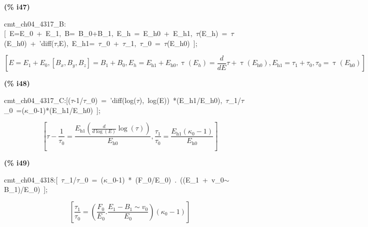 \documentclass[fleqn]{article}
\begin{document}
\noindent
\begin{minipage}[t]{4.000000em}\color{red}\bfseries
(\% i47)	
\end{minipage}
\begin{minipage}[t]{\textwidth}\color{blue}
cmt\_ch04\_4317\_B:[\ E=E\_0\ +\ E\_1,\ B=\ B\_0+B\_1,\ E\_h\ =\ E\_h0\ +\ E\_h1,\ \ensuremath{\tau}(E\_h)\ =\ \ensuremath{\tau}(E\_h0)\ +\ 'diff(\ensuremath{\tau},E),\ E\_h1=\ \ensuremath{\tau}\_0\ +\ \ensuremath{\tau}\_1,\ \ensuremath{\tau}\_0\ =\ \ensuremath{\tau}(E\_h0)\ ];
\end{minipage}
\[\displaystyle \tag{\% o47} 
\left[ E={E_1}+{E_0}\operatorname{,}\left[ {B_x}\operatorname{,}{B_y}\operatorname{,}{B_z}\right] ={B_1}+{B_0}\operatorname{,}{E_h}={E_{\ensuremath{\mathrm{h1}}}}+{E_{\ensuremath{\mathrm{h0}}}}\operatorname{,}\operatorname{\tau }\left( {E_h}\right) =\frac{d}{d E} \tau +\operatorname{\tau }\left( {E_{\ensuremath{\mathrm{h0}}}}\right) \operatorname{,}{E_{\ensuremath{\mathrm{h1}}}}={{\tau }_1}+{{\tau }_0}\operatorname{,}{{\tau }_0}=\operatorname{\tau }\left( {E_{\ensuremath{\mathrm{h0}}}}\right) \right] \mbox{}
\]


\noindent
\begin{minipage}[t]{4.000000em}\color{red}\bfseries
(\% i48)	
\end{minipage}
\begin{minipage}[t]{\textwidth}\color{blue}
cmt\_ch04\_4317\_C:[(\ensuremath{\tau}-1/\ensuremath{\tau}\_0)\ =\ 'diff(log(\ensuremath{\tau}),\ log(E))\ *(E\_h1/E\_h0),\ \ensuremath{\tau}\_1/\ensuremath{\tau}\_0\ =(\ensuremath{\kappa}\_0-1)*(E\_h1/E\_h0)\ ];
\end{minipage}
\[\displaystyle \tag{\% o48} 
\left[ \tau -\frac{1}{{{\tau }_0}}=\frac{{E_{\ensuremath{\mathrm{h1}}}} \left( \frac{d}{d \log{(E)}} \log{\left( \tau \right) }\right) }{{E_{\ensuremath{\mathrm{h0}}}}}\operatorname{,}\frac{{{\tau }_1}}{{{\tau }_0}}=\frac{{E_{\ensuremath{\mathrm{h1}}}} \left( {{\kappa }_0}-1\right) }{{E_{\ensuremath{\mathrm{h0}}}}}\right] \mbox{}
\]


\noindent
\begin{minipage}[t]{4.000000em}\color{red}\bfseries
(\% i49)	
\end{minipage}
\begin{minipage}[t]{\textwidth}\color{blue}
cmt\_ch04\_4318:[\ \ensuremath{\tau}\_1/\ensuremath{\tau}\_0\ =\ (\ensuremath{\kappa}\_0-1)\ *\ (F\_0/E\_0)\ .\ ((E\_1\ +\ v\_0\ensuremath{\sim\ }B\_1)/E\_0)\ ];
\end{minipage}
\[\displaystyle \tag{\% o49} 
\left[ \frac{{{\tau }_1}}{{{\tau }_0}}=\left( \frac{{F_0}}{{E_0}}\ensuremath{\mathrm{ . }}\frac{{E_1}-{B_1}\operatorname{\sim  }{v_0}}{{E_0}}\right)  \left( {{\kappa }_0}-1\right) \right] \mbox{}
\]
\end{document}
